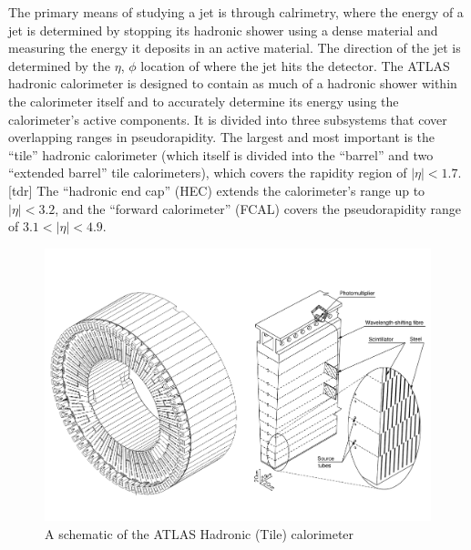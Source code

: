The primary means of studying a jet is through calrimetry, where the energy of a jet is determined by stopping its hadronic shower using a dense material and measuring the energy it deposits in an active material.
The direction of the jet is determined by the  $\eta$, $\phi$ location of where the jet hits the detector.
The ATLAS hadronic calorimeter is designed to contain as much of a hadronic shower within the calorimeter itself and to accurately determine its energy using the calorimeter's active components.
It is divided into three subsystems that cover overlapping ranges in pseudorapidity.
The largest and most important is the ``tile'' hadronic calorimeter (which itself is divided into the ``barrel'' and two ``extended barrel'' tile calorimeters), which covers the rapidity region of $|\eta| < 1.7$. [tdr]  
The ``hadronic end cap'' (HEC) extends the calorimeter's range up to $|\eta| < 3.2$, and the ``forward calorimeter'' (FCAL) covers the pseudorapidity range of $3.1 < |\eta| < 4.9$.  

\begin{figure}
  \begin{center}
    \includegraphics[width=125mm]{figures/atlas/TileCalorimeter.pdf}
  \end{center}
  \caption{A schematic of the ATLAS Hadronic (Tile) calorimeter}
  \label{img:AtlasDetectorOverview}
\end{figure}





